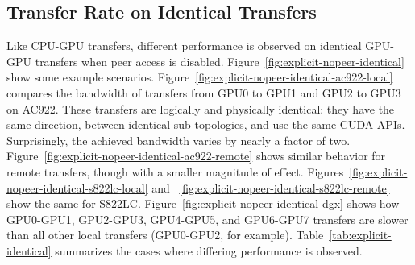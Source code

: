 \subsection{Transfer Rate on Identical Transfers}
\label{sec:explicit-peer-identical}

Like CPU-GPU transfers, different performance is observed on identical GPU-GPU transfers when peer access is disabled.
Figure~\ref{fig:explicit-nopeer-identical} show some example scenarios.
Figure~\ref{fig:explicit-nopeer-identical-ac922-local} compares the bandwidth of transfers from GPU0 to GPU1 and GPU2 to GPU3 on AC922.
These transfers are logically and physically identical: they have the same direction, between identical sub-topologies, and use the same CUDA APIs.
Surprisingly, the achieved bandwidth varies by nearly a factor of two.
Figure~\ref{fig:explicit-nopeer-identical-ac922-remote} shows similar behavior for remote transfers, though with a smaller magnitude of effect.
Figures~\ref{fig:explicit-nopeer-identical-s822lc-local} and ~\ref{fig:explicit-nopeer-identical-s822lc-remote} show the same for S822LC.
Figure~\ref{fig:explicit-nopeer-identical-dgx} shows how GPU0-GPU1, GPU2-GPU3, GPU4-GPU5, and GPU6-GPU7 transfers are slower than all other local transfers (GPU0-GPU2, for example).
Table~\ref{tab:explicit-identical} summarizes the cases where differing performance is observed.

